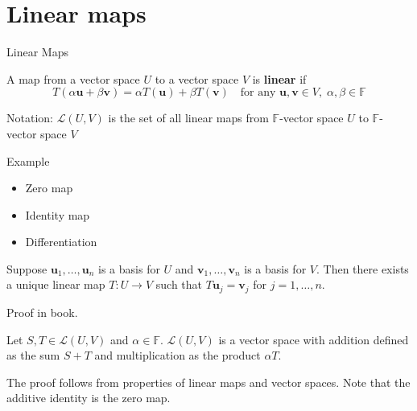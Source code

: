 \documentclass [aspectratio=169]{beamer}
\newcommand{\bu}{{\mathbf{u}}}
\newcommand{\bv}{{\mathbf{v}}}
\newcommand{\F}{{\mathbb{F}}}
\begin{document}
\section{Linear maps}


\begin{frame}{Linear Maps}
\begin{definition}
A map from a vector space $U$ to a vector space $V$ is \textbf{linear} if
\begin{equation*}
    T(\alpha \bu + \beta \bv) = \alpha T(\bu) + \beta T(\bv) \quad \text{for any } \bu, \bv \in V, \; \alpha, \beta \in \F
\end{equation*}
\end{definition}

\vspace{1em}

Notation: $\mathcal{L}(U,V)$ is the set of all linear maps from $\F$-vector space $U$ to $\F$-vector space $V$

\end{frame}


\begin{frame}
\begin{exampleblock}{Example}

\begin{itemize}
\setlength\itemsep{4em}
\item Zero map
\item Identity map
\item Differentiation
\end{itemize}
\vspace{5em}
\end{exampleblock}
\end{frame}


\begin{frame}
\begin{theorem}
Suppose $\bu_1, \ldots, \bu_n$ is a basis for $U$ and $\bv_1, \ldots, \bv_n$ is a basis for $V$. Then there exists a unique linear map $T:U \to V$ such that $T \bu_j = \bv_j$ for $j=1,\ldots, n$.
\end{theorem}

Proof in book.
\vspace{1em}

\begin{theorem}
Let $S,T \in \mathcal{L}(U,V)$ and $\alpha \in \F$. $\mathcal{L}(U,V)$ is a vector space with addition defined as the sum $S+T$ and multiplication as the product $\alpha T$.
\end{theorem}

The proof follows from properties of linear maps and vector spaces. Note that the additive identity is the zero map.
\end{frame}
\end{document}
